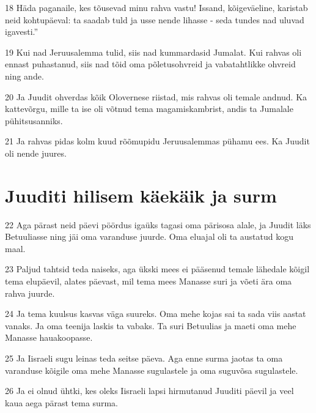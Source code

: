 \par 18 Häda paganaile, kes tõusevad minu rahva vastu! Issand, kõigeväeline, karistab neid kohtupäeval: ta saadab tuld ja usse nende lihasse - seda tundes nad uluvad igavesti.”
\par 19 Kui nad Jeruusalemma tulid, siis nad kummardasid Jumalat. Kui rahvas oli ennast puhastanud, siis nad tõid oma põletusohvreid ja vabatahtlikke ohvreid ning ande.
\par 20 Ja Juudit ohverdas kõik Olovernese riistad, mis rahvas oli temale andnud. Ka kattevõrgu, mille ta ise oli võtnud tema magamiskambrist, andis ta Jumalale pühitsusanniks.
\par 21 Ja rahvas pidas kolm kuud rõõmupidu Jeruusalemmas pühamu ees. Ka Juudit oli nende juures.

\section*{Juuditi hilisem käekäik ja surm}

\par 22 Aga pärast neid päevi pöördus igaüks tagasi oma pärisosa alale, ja Juudit läks Betuuliasse ning jäi oma varanduse juurde. Oma eluajal oli ta austatud kogu maal.
\par 23 Paljud tahtsid teda naiseks, aga ükski mees ei pääsenud temale lähedale kõigil tema elupäevil, alates päevast, mil tema mees Manasse suri ja võeti ära oma rahva juurde.
\par 24 Ja tema kuulsus kasvas väga suureks. Oma mehe kojas sai ta sada viis aastat vanaks. Ja oma teenija laskis ta vabaks. Ta suri Betuulias ja maeti oma mehe Manasse hauakoopasse.
\par 25 Ja Iisraeli sugu leinas teda seitse päeva. Aga enne surma jaotas ta oma varanduse kõigile oma mehe Manasse sugulastele ja oma suguvõsa sugulastele.
\par 26 Ja ei olnud ühtki, kes oleks Iisraeli lapsi hirmutanud Juuditi päevil ja veel kaua aega pärast tema surma.



